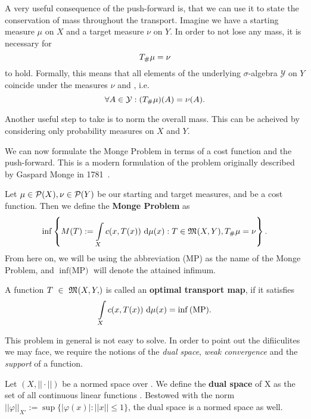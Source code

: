 A very useful consequence of the push-forward is, that we can use it to state the conservation of mass throughout the transport. Imagine we have a starting measure $\mu$ on $X$ and a target measure $\nu$ on $Y$. In order to not lose any mass, it is necessary for
\[ {T}_{\#} \mu = \nu \]
to hold. Formally, this means that all elements of the underlying $\sigma$-algebra $\mathcal{Y}$ on $Y$ coincide under the measures $\nu$ and \push{\mu}, i.e.
\[ \forall A \in \mathcal{Y}: ({T}_{\#} \mu)(A) = \nu(A).\]

Another useful step to take is to norm the overall mass. This can be acheived by considering only probability measures on $X$ and $Y$.

We can now formulate the Monge Problem in terms of a cost function and the push-forward. This is a modern formulation of the problem originally described by Gaspard Monge in 1781~\cite{Mon1781}.

\begin{definition}\label{MongeProb}
	Let $\mu \in \mathcal{P}(X), \nu \in \mathcal{P}(Y)$ be our starting and target measures, and  be a cost function. Then we define the \textbf{Monge Problem} as
	\begin{equation}\label{MP}
		\inf \left\{ M(T) := \int\limits_X c(x, T(x))~\text{d}{\mu}({x}) : T \in \mathfrak{M}_{}(X, Y), {T}_{\#} \mu = \nu \right\}.
	\end{equation}
	From here on, we will be using the abbreviation (MP) as the name of the Monge Problem, and $\inf \text{(MP)}$ will denote the attained infimum.
\end{definition}

\begin{definition}\label{OTM}
	A function $T~\in~\MF{X, Y}$ is called an \textbf{optimal transport map}, if it satisfies
	\[ \int\limits_X c(x, T(x))~\text{d}{\mu}({x}) = \inf \text{(MP)}. \]
\end{definition}

This problem in general is not easy to solve. In order to point out the difiiculites we may face, we require the notions of the \textit{dual space}, \textit{weak convergence} and the \textit{support} of a function.

\begin{definition}\label{DuaSpa}
	Let $(X, ||\cdot||)$ be a normed space over \K. We define the \textbf{dual space} of X as the set of all continuous linear functions . Bestowed with the norm $||\varphi||_{X'} := \sup \{ |\varphi(x)| : ||x|| \le 1 \}$, the dual space is a normed space as well.
\end{definition}

